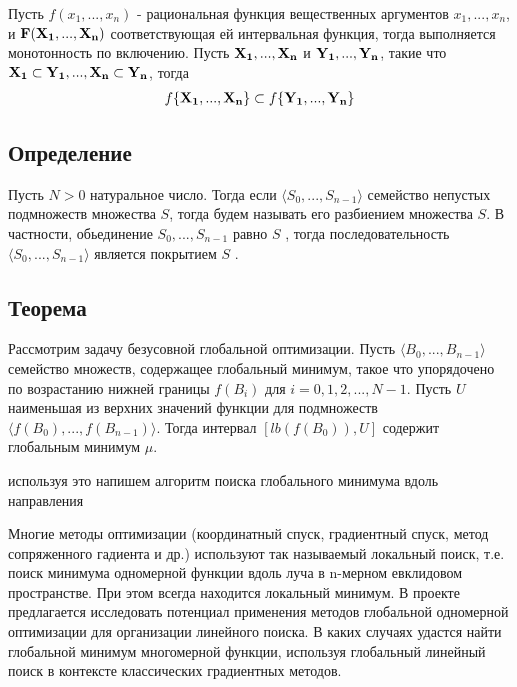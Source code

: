 \documentclass{article}
\begin{document}
    Пусть $f(x_1, ..., x_n)$ - рациональная функция вещественных аргументов $x_1, ..., x_n$, и $\bold{F(X_1, ..., X_n)}$ соответствующая ей интервальная функция, тогда выполняется монотонность по включению.
    Пусть $\bold{X_1},...,\bold{X_n}$ и $\bold{Y_1},...,\bold{Y_n}$, такие что $\bold{X_1} \subset \bold{Y_1},...,\bold{X_n} \subset \bold{Y_n}$, тогда
    \begin{gather*}
        f\{\bold{X_1},...,\bold{X_n}\} \subset f\{\bold{Y_1},...,\bold{Y_n}\}
    \end{gather*}

    \subsection{Определение}

    Пусть $N > 0$  натуральное число. Тогда если $\langle S_0,..., S_{n-1} \rangle$ семейство непустых подмножеств множества $S$, тогда будем называть его разбиением множества $S$. В частности, обьединение $S_0,..., S_{n-1}$ равно $S$ , тогда последовательность $\langle S_0,..., S_{n-1} \rangle$ является покрытием $S$ .

    \subsection{Теорема}

    Рассмотрим задачу безусовной глобальной оптимизации. Пусть $\langle B_0,..., B_{n-1} \rangle$ семейство множеств, содержащее глобальный минимум, такое что упорядочено по возрастанию нижней границы $f(B_i)$ для $i=0, 1, 2,..., N-1$. Пусть $U$ наименьшая из верхних значений функции для подмножеств $\langle f(B_0),..., f(B_{n-1}) \rangle$. Тогда интервал $[lb(f(B_0)), U]$ содержит глобальным минимум $\mu$.


    используя это напишем алгоритм поиска глобального минимума вдоль направления


    \newpage
    
    




    Многие методы оптимизации (координатный спуск, градиентный спуск, метод сопряженного гадиента и др.) используют так называемый локальный поиск, т.е. поиск минимума одномерной функции вдоль луча в n-мерном евклидовом пространстве. При этом всегда находится локальный минимум. В проекте предлагается исследовать потенциал применения методов глобальной одномерной оптимизации для организации линейного поиска. В каких случаях удастся найти глобальной минимум многомерной функции, используя глобальный линейный поиск в контексте классических градиентных методов.
\end{document}
